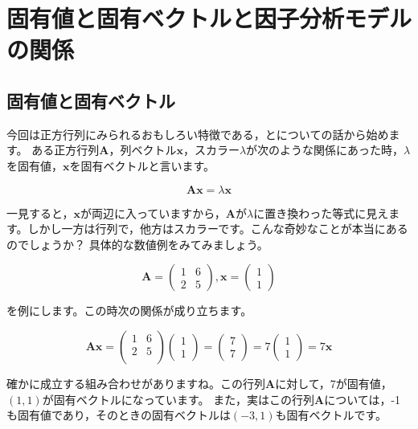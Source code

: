 \documentclass{ltjsbook}
\begin{document}
\chapter{固有値と固有ベクトルと因子分析モデルの関係}
\label{x08_eigen}

\section{固有値と固有ベクトル}
今回は正方行列にみられるおもしろい特徴である，とについての話から始めます。
ある正方行列$\bm{A}$，列ベクトル$\bm{x}$，スカラー$\lambda$が次のような関係にあった時，$\lambda$を固有値，$\bm{x}$を固有ベクトルと言います。

\[ \bm{Ax} = \lambda\bm{x} \]

一見すると，$\bm{x}$が両辺に入っていますから，$\bm{A}$が$\lambda$に置き換わった等式に見えます。しかし一方は行列で，他方はスカラーです。こんな奇妙なことが本当にあるのでしょうか？
具体的な数値例をみてみましょう。

\[
	\bm{A} = \begin{pmatrix}
		1 & 6 \\ 2 & 5
	\end{pmatrix}
	,\bm{x} = \begin{pmatrix}
		1 \\ 1
	\end{pmatrix}
\]

を例にします。この時次の関係が成り立ちます。

\[
	\bm{Ax} =
	\begin {pmatrix}
	1 & 6 \\
	2 & 5 \\
	\end{pmatrix}
	\begin{pmatrix}
		1 \\ 1
	\end{pmatrix}
	=
	\begin{pmatrix}
		7 \\ 7
	\end{pmatrix}
	=7
	\begin{pmatrix}
		1 \\ 1
	\end{pmatrix}
	=7 \bm{x}
\]

確かに成立する組み合わせがありますね。この行列$\bm{A}$に対して，7が固有値，$(1,1)$が固有ベクトルになっています。
また，実はこの行列$\bm{A}$については，-1も固有値であり，そのときの固有ベクトルは$(-3,1)$も固有ベクトルです。
\end{document}
